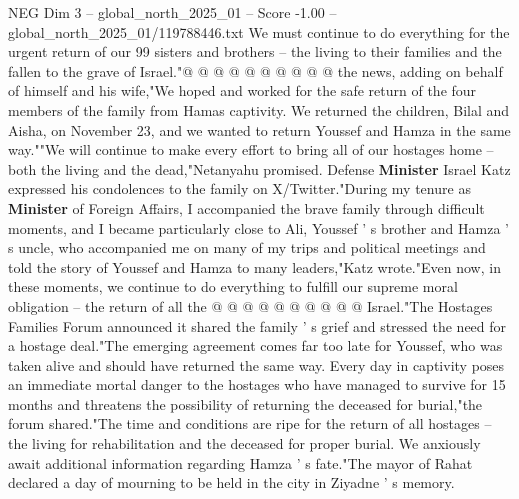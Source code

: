 \begin{textsample}{NEG Dim 3 – global\_north\_2025\_01 – Score -1.00 – global\_north\_2025\_01/119788446.txt}
We must continue to do everything for the urgent return of our 99 sisters and brothers -- the living to their families and the fallen to the grave of Israel."@ @ @ @ @ @ @ @ @ @ the news, adding on behalf of himself and his wife,"We hoped and worked for the safe return of the four members of the family from Hamas captivity.
We returned the children, Bilal and Aisha, on November 23, and we wanted to return Youssef and Hamza in the same way.""We will continue to make every effort to bring all of our hostages home -- both the living and the dead,"Netanyahu promised.
Defense \textbf{Minister} Israel Katz expressed his condolences to the family on X/Twitter."During my tenure as \textbf{Minister} of Foreign Affairs, I accompanied the brave family through difficult moments, and I became particularly close to Ali, Youssef ' s brother and Hamza ' s uncle, who accompanied me on many of my trips and political meetings and told the story of Youssef and Hamza to many leaders,"Katz wrote."Even now, in these moments, we continue to do everything to fulfill our supreme moral obligation -- the return of all the @ @ @ @ @ @ @ @ @ @ Israel."The Hostages Families Forum announced it shared the family ' s grief and stressed the need for a hostage deal."The emerging agreement comes far too late for Youssef, who was taken alive and should have returned the same way.
Every day in captivity poses an immediate mortal danger to the hostages who have managed to survive for 15 months and threatens the possibility of returning the deceased for burial,"the forum shared."The time and conditions are ripe for the return of all hostages -- the living for rehabilitation and the deceased for proper burial.
We anxiously await additional information regarding Hamza ' s fate."The mayor of Rahat declared a day of mourning to be held in the city in Ziyadne ' s memory.

\end{textsample}
